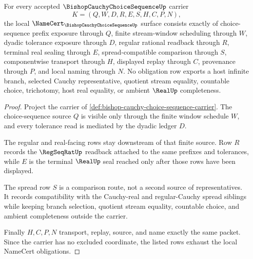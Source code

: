 \begin{theorem}
\label{thm:bishop-cauchy-choice-sequence-namecert-obligations}
For every accepted $\BishopCauchyChoiceSequenceUp$ carrier
$$
K=(Q,W,D,R,E,S,H,C,P,N),
$$
the local $\NameCert_{\BishopCauchyChoiceSequenceUp}$ surface consists exactly of choice-sequence prefix exposure through $Q$, finite stream-window scheduling through $W$, dyadic tolerance exposure through $D$, regular rational readback through $R$, terminal real sealing through $E$, spread-compatible comparison through $S$, componentwise transport through $H$, displayed replay through $C$, provenance through $P$, and local naming through $N$. No obligation row exports a host infinite branch, selected Cauchy representative, quotient stream equality, countable choice, trichotomy, host real equality, or ambient $\RealUp$ completeness.
\end{theorem}
\begin{proof}
Project the carrier of \autoref{def:bishop-cauchy-choice-sequence-carrier}. The choice-sequence source $Q$ is visible only through the finite window schedule $W$, and every tolerance read is mediated by the dyadic ledger $D$.

The regular and real-facing rows stay downstream of that finite source. Row $R$ records the $\RegSeqRatUp$ readback attached to the same prefixes and tolerances, while $E$ is the terminal $\RealUp$ seal reached only after those rows have been displayed.

The spread row $S$ is a comparison route, not a second source of representatives. It records compatibility with the Cauchy-real and regular-Cauchy spread siblings while keeping branch selection, quotient stream equality, countable choice, and ambient completeness outside the carrier.

Finally $H,C,P,N$ transport, replay, source, and name exactly the same packet. Since the carrier has no excluded coordinate, the listed rows exhaust the local NameCert obligations.
\end{proof}

